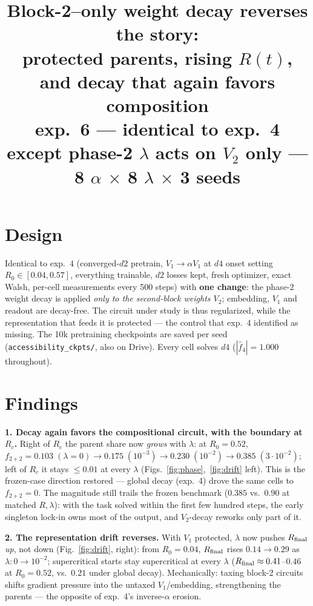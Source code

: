 \documentclass[10pt]{article}
\title{\vspace{-1.4cm}Block-2--only weight decay reverses the story:\\
protected parents, rising $R(t)$, and decay that again favors composition\\
\large exp.~6 --- identical to exp.~4 except phase-2 $\lambda$ acts on $V_2$ only ---
8 $\alpha$ $\times$ 8 $\lambda$ $\times$ 3 seeds}
\author{}\date{\vspace{-1.2cm}}
\begin{document}
\maketitle\vspace{-1.9cm}

\section*{Design}
Identical to exp.~4 (converged-$d2$ pretrain, $V_1\!\to\!\alpha V_1$ at $d4$ onset setting
$R_0\in[0.04,0.57]$, everything trainable, $d2$ losses kept, fresh optimizer, exact Walsh,
per-cell measurements every 500 steps) with \textbf{one change}: the phase-2 weight decay is
applied \emph{only to the second-block weights $V_2$}; embedding, $V_1$ and readout are
decay-free. The circuit under study is thus regularized, while the representation that feeds it
is protected --- the control that exp.~4 identified as missing. The 10k pretraining checkpoints
are saved per seed (\texttt{accessibility\_ckpts/}, also on Drive). Every cell solves $d4$
($|\hat f_4|=1.000$ throughout).

\section*{Findings}
\textbf{1. Decay again favors the compositional circuit, with the boundary at $R_c$.} Right of
$R_c$ the parent share now \emph{grows} with $\lambda$: at $R_0=0.52$,
$f_{2+2}=0.103\;(\lambda{=}0)\to0.175\;(10^{-3})\to0.230\;(10^{-2})\to0.385\;(3{\cdot}10^{-2})$;
left of $R_c$ it stays $\leq0.01$ at every $\lambda$ (Figs.~\ref{fig:phase},~\ref{fig:drift}
left). This is the frozen-case direction restored --- global decay (exp.~4) drove the same
cells to $f_{2+2}=0$. The magnitude still trails the frozen benchmark ($0.385$ vs.\ $0.90$ at
matched $R,\lambda$): with the task solved within the first few hundred steps, the early
singleton lock-in owns most of the output, and $V_2$-decay reworks only part of it.

\textbf{2. The representation drift reverses.} With $V_1$ protected, $\lambda$ now pushes
$R_{\rm final}$ \emph{up}, not down (Fig.~\ref{fig:drift}, right): from $R_0=0.04$,
$R_{\rm final}$ rises $0.14\to0.29$ as $\lambda\!:0\to10^{-2}$; supercritical starts stay
supercritical at every $\lambda$ ($R_{\rm final}\approx0.41$--$0.46$ at $R_0=0.52$, vs.\
$0.21$ under global decay). Mechanically: taxing block-2 circuits shifts gradient pressure
into the untaxed $V_1$/embedding, strengthening the parents --- the opposite of exp.~4's
inverse-$\alpha$ erosion.
\end{document}
